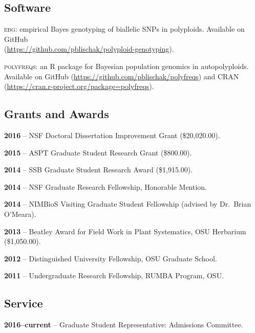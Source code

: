 \documentclass[]{article}
\begin{document}
\subsection{\texorpdfstring{\textbf{Software}}{Software}}\label{software}

\textsc{ebg}: empirical Bayes genotyping of biallelic SNPs in polyploids. Available on GitHub\\
(\href{https://github.com/pblischak/polyploid-genotyping}{https://github.com/pblischak/polyploid-genotyping}).

\textsc{polyfreqs}: an R package for Bayesian population genomics in autopolyploids. Available on GitHub
(\href{https://github.com/pblischak/polyfreqs}{\url{https://github.com/pblischak/polyfreqs}}) and CRAN
(\href{https://cran.r-project.org/package=polyfreqs}{\url{https://cran.r-project.org/package=polyfreqs}}).



\subsection{\texorpdfstring{\textbf{Grants and
Awards}}{Grants and Awards}}\label{grants-and-awards}

\textbf{2016} -- NSF Doctoral Dissertation Improvement Grant (\$20,020.00).

\textbf{2015} -- ASPT Graduate Student Research Grant (\$800.00).

\textbf{2014} -- SSB Graduate Student Research Award (\$1,915.00).

\textbf{2014} -- NSF Graduate Research Fellowship, Honorable Mention.

\textbf{2014} -- NIMBioS Visiting Graduate Student Fellowship (advised
by Dr.~Brian O'Meara).

\textbf{2013} -- Beatley Award for Field Work in Plant Systematics, OSU
Herbarium (\$1,050.00).

\textbf{2012} -- Distinguished University Fellowship, OSU Graduate
School.

\textbf{2011} -- Undergraduate Research Fellowship, RUMBA Program, OSU.

\subsection{\texorpdfstring{\textbf{Service}}{Service}}\label{service}

\textbf{2016--current} -- Graduate Student Representative: Admissions Committee.
\end{document}
